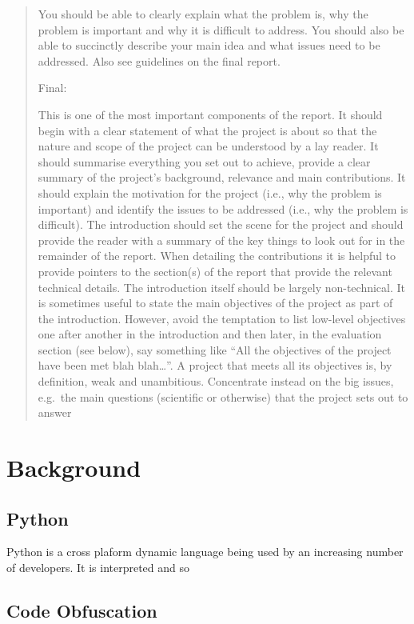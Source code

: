 \documentclass{report}
\begin{document}
\begin{quote}
You should be able to clearly explain what the problem is, why the
problem is important and why it is difficult to address. You should
also be able to succinctly describe your main idea and what issues
need to be addressed. Also see guidelines on the final report.

Final:

This is one of the most important components of the report. It
should begin with a clear statement of what the project is about so
that the nature and scope of the project can be understood by a lay
reader. It should summarise everything you set out to achieve,
provide a clear summary of the project's background, relevance and
main contributions. It should explain the motivation for the
project (i.e., why the problem is important) and identify the
issues to be addressed (i.e., why the problem is difficult). The
introduction should set the scene for the project and should
provide the reader with a summary of the key things to look out for
in the remainder of the report. When detailing the contributions it
is helpful to provide pointers to the section(s) of the report that
provide the relevant technical details. The introduction itself
should be largely non-technical. It is sometimes useful to state
the main objectives of the project as part of the introduction.
However, avoid the temptation to list low-level objectives one
after another in the introduction and then later, in the evaluation
section (see below), say something like
``All the objectives of the project have been met blah blah\ldots{}''.
A project that meets all its objectives is, by definition, weak and
unambitious. Concentrate instead on the big issues, e.g.~the main
questions (scientific or otherwise) that the project sets out to
answer

\end{quote}
\section{Background}

\subsection{Python}

Python is a cross plaform dynamic language being used by an increasing
number of developers. It is interpreted and so 

\subsection{Code Obfuscation}
\end{document}
